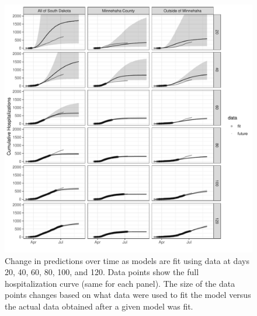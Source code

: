 \documentclass[
]{article}
\begin{document}
\begin{figure}
\centering
\includegraphics{manuscript_updates_after_submittingon7102020_files/figure-latex/unnamed-chunk-4-1.pdf}
\caption{\label{fig:unnamed-chunk-4}Change in predictions over time as models are fit using data at days 20, 40, 60, 80, 100, and 120. Data points show the full hospitalization curve (same for each panel). The size of the data points changes based on what data were used to fit the model versus the actual data obtained after a given model was fit.\label{pred_overtime:plot}}
\end{figure}
\end{document}
